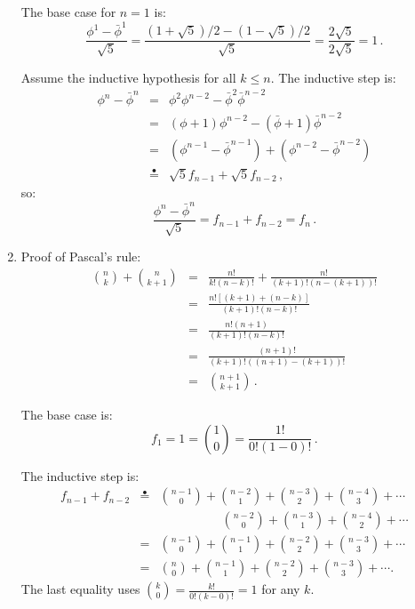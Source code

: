 \documentclass[11pt,a4paper]{report}
\newcommand*{\ih}{\stackrel{\bullet}{=}}
\begin{document}
\begin{enumerate}
The base case for $n=1$ is:
\[
\frac{\phi^1 - \bar{\phi}^1}{\sqrt{5}}=\frac{(1+\sqrt{5})/2-(1-\sqrt{5})/2}{\sqrt{5}}=\frac{2\sqrt{5}}{2\sqrt{5}}=1\,.
\]

Assume the inductive hypothesis for all $k\leq n$. The inductive step is:
\begin{eqnarray*}
\phi^n - \bar{\phi}^n &=& \phi^2\phi^{n-2} - \bar{\phi}^2\bar{\phi}^{n-2}\\
&=&(\phi+1)\phi^{n-2} - (\bar{\phi}+1)\bar{\phi}^{n-2}\\
&=&(\phi^{n-1} - \bar{\phi}^{n-1}) + (\phi^{n-2} - \bar{\phi}^{n-2})\\
&\ih&\sqrt{5}f_{n-1} + \sqrt{5}f_{n-2}\,,
\end{eqnarray*}
so:
\[
\frac{\phi^n - \bar{\phi}^n}{\sqrt{5}} = f_{n-1} + f_{n-2} = f_n\,.
\]

\newpage

\item Proof of Pascal's rule:
\begin{eqnarray*}
{n \choose k} + {n \choose k+1} &=& \frac{n!}{k!(n-k)!} + \frac{n!}{(k+1)!(n-(k+1))!}\\
&=&\frac{n![(k+1)+(n-k)]}{(k+1)!(n-k)!}\\
&=&\frac{n!(n+1)}{(k+1)!(n-k)!}\\
&=&\frac{(n+1)!}{(k+1)!((n+1)-(k+1))!}\\
&=&{n+1 \choose k+1}\,.
\end{eqnarray*}

The base case is:
\[
f_1 = 1 = {1 \choose 0} = \frac{1!}{0!(1-0)!}\,.
\]

The inductive step is:
\begin{eqnarray*}
f_{n-1} + f_{n-2} &\ih& {n-1 \choose 0} + {n-2 \choose 1} + {n-3 \choose 2} + {n-4 \choose 3} + \cdots\\
&&\hspace{5em}{n-2 \choose 0} + {n-3 \choose 1} + {n-4 \choose 2} + \cdots\\
&=&{n-1 \choose 0} + {n-1 \choose 1} + {n-2 \choose 2} + {n-3 \choose 3} + \cdots\\
&=&{n \choose 0} + {n-1 \choose 1} + {n-2 \choose 2} + {n-3 \choose 3} + \cdots.
\end{eqnarray*}
The last equality uses ${k \choose 0} = \frac{k!}{0!(k-0)!} = 1$ for any $k$.

\end{enumerate}
\end{document}
